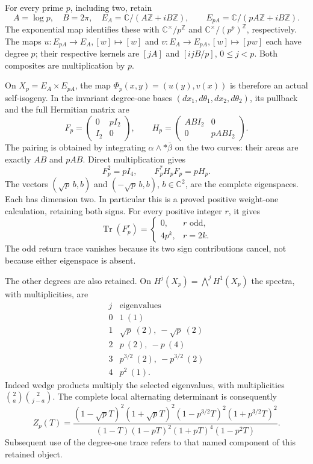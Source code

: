 \documentclass[
]{article}
\begin{document}
For every prime \(p\), including two, retain \[
A=\log p,\quad B=2\pi,\quad
E_A=\mathbb C/(A\mathbb Z+iB\mathbb Z),\qquad
E_{pA}=\mathbb C/(pA\mathbb Z+iB\mathbb Z).
\tag{PRI1.1}
\] The exponential map identifies these with
\(\mathbb C^\times/p^{\mathbb Z}\) and
\(\mathbb C^\times/(p^p)^{\mathbb Z}\), respectively. The maps
\(u:E_{pA}\to E_A,[w]\mapsto[w]\) and \(v:E_A\to E_{pA},[w]\mapsto[pw]\)
each have degree \(p\); their respective kernels are \([jA]\) and
\([ijB/p]\), \(0\leq j<p\). Both composites are multiplication by \(p\).

On \(X_p=E_A\times E_{pA}\), the map \(\Phi_p(x,y)=(u(y),v(x))\) is
therefore an actual self-isogeny. In the invariant degree-one bases
\((dx_1,d\theta_1,dx_2,d\theta_2)\), its pullback and the full Hermitian
matrix are \[
F_p=\begin{pmatrix}0&pI_2\\I_2&0\end{pmatrix},\qquad
H_p=\begin{pmatrix}AB I_2&0\\0&pAB I_2\end{pmatrix}.
\tag{PRI1.2}
\] The pairing is obtained by integrating \(\alpha\wedge *\bar\beta\) on
the two curves: their areas are exactly \(AB\) and \(pAB\). Direct
multiplication gives \[
F_p^2=pI_4,\qquad F_p^*H_pF_p=pH_p.
\tag{PRI1.3}
\] The vectors \((\sqrt p\,b,b)\) and \((-\sqrt p\,b,b)\),
\(b\in\mathbb C^2\), are the complete eigenspaces. Each has dimension
two. In particular this is a proved positive weight-one calculation,
retaining both signs. For every positive integer \(r\), it gives \[
\operatorname{Tr}(F_p^r)=
\begin{cases}0,&r\text{ odd},\\4p^k,&r=2k.\end{cases}
\tag{PRI1.4}
\] The odd return trace vanishes because its two sign contributions
cancel, not because either eigenspace is absent.

The other degrees are also retained. On \(H^j(X_p)=\bigwedge^jH^1(X_p)\)
the spectra, with multiplicities, are \[
\begin{array}{c|l}
j&\text{eigenvalues}\\\hline
0&1\ (1)\\
1&\sqrt p\ (2),\ -\sqrt p\ (2)\\
2&p\ (2),\ -p\ (4)\\
3&p^{3/2}\ (2),\ -p^{3/2}\ (2)\\
4&p^2\ (1).
\end{array}
\tag{PRI1.5}
\] Indeed wedge products multiply the selected eigenvalues, with
multiplicities \(\binom2a\binom2{j-a}\). The complete local alternating
determinant is consequently \[
Z_p(T)=
\frac{(1-\sqrt pT)^2(1+\sqrt pT)^2
      (1-p^{3/2}T)^2(1+p^{3/2}T)^2}
{(1-T)(1-pT)^2(1+pT)^4(1-p^2T)}.
\tag{PRI1.6}
\] Subsequent use of the degree-one trace refers to that named component
of this retained object.
\end{document}
